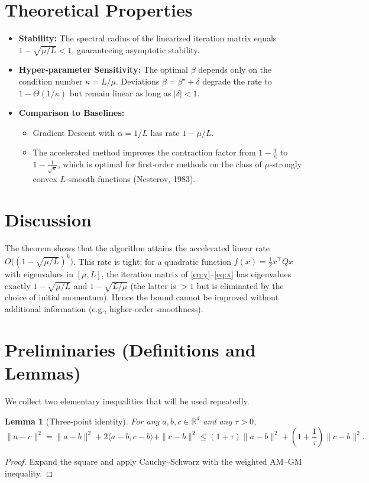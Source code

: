\documentclass{article}
\newtheorem{lemma}{Lemma}
\newcommand{\R}{\mathbb{R}}
\begin{document}
\section*{Theoretical Properties}
\begin{itemize}
\item \textbf{Stability:} The spectral radius of the linearized iteration matrix equals $1-\sqrt{\mu/L}<1$, guaranteeing asymptotic stability.
\item \textbf{Hyper‑parameter Sensitivity:} The optimal $\beta$ depends only on the condition number $\kappa=L/\mu$. Deviations $\beta=\beta^{\star}+\delta$ degrade the rate to $1-\Theta(1/\kappa)$ but remain linear as long as $|\delta|<1$.
\item \textbf{Comparison to Baselines:}
    \begin{itemize}
        \item Gradient Descent with $\alpha=1/L$ has rate $1-\mu/L$.
        \item The accelerated method improves the contraction factor from $1-\frac{1}{\kappa}$ to $1-\frac{1}{\sqrt{\kappa}}$, which is optimal for first‑order methods on the class of $\mu$‑strongly convex $L$‑smooth functions (Nesterov, 1983).
    \end{itemize}
\end{itemize}

\section*{Discussion}
The theorem shows that the algorithm attains the accelerated linear rate $O\!\bigl((1-\sqrt{\mu/L})^{k}\bigr)$.  This rate is tight: for a quadratic function $f(x)=\frac{1}{2}x^{\top}Qx$ with eigenvalues in $[\mu,L]$, the iteration matrix of \eqref{eq:y}–\eqref{eq:x} has eigenvalues exactly $1-\sqrt{\mu/L}$ and $1-\sqrt{L/\mu}$ (the latter is $>1$ but is eliminated by the choice of initial momentum).  Hence the bound cannot be improved without additional information (e.g., higher‑order smoothness).

\newpage
\section*{Preliminaries (Definitions and Lemmas)}
We collect two elementary inequalities that will be used repeatedly.

\begin{lemma}[Three‑point identity]\label{lem:three}
For any $a,b,c\in\R^{d}$ and any $\tau>0$,
\[
\|a-c\|^{2}= \|a-b\|^{2}+2\langle a-b,c-b\rangle+\|c-b\|^{2}
\le (1+\tau)\|a-b\|^{2}+\left(1+\frac{1}{\tau}\right)\|c-b\|^{2}.
\tag{L1}
\]
\end{lemma}
\begin{proof}
Expand the square and apply Cauchy–Schwarz with the weighted AM–GM inequality.
\end{proof}
\end{document}
